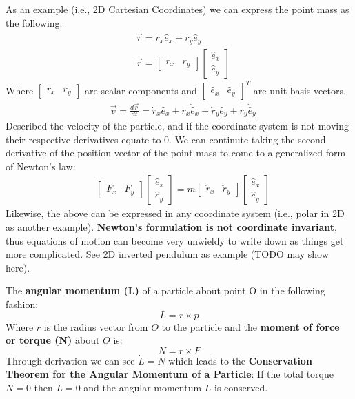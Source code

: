\documentclass{article}
\begin{document}
As an example (i.e., 2D Cartesian Coordinates) we can express the point mass as the following:
\begin{align*}
    & \vec{r} = r_x \hat{e}_x + r_y \hat{e}_y \\
    & \vec{r} = \begin{bmatrix} r_x & r_y \end{bmatrix} \begin{bmatrix}\hat{e}_x \\ \hat{e}_y\end{bmatrix}
\end{align*}
Where $\begin{bmatrix} r_x & r_y \end{bmatrix}$ are scalar components and $\begin{bmatrix}\hat{e}_x & \hat{e}_y\end{bmatrix}^T$ are unit basis vectors.
\begin{align*}
    & \vec{v} = \frac{d\vec{r}}{dt} = \dot{r}_x \hat{e}_x + r_x \dot{\hat{e}}_x + \dot{r}_y \hat{e}_y + r_y \dot{\hat{e}}_y
\end{align*}
Described the velocity of the particle, and if the coordinate system is not moving their respective derivatives equate to 0. We can continute taking the second derivative of the position vector of the point mass to come to a generalized form of Newton's law:
\begin{align*}
    & \begin{bmatrix}F_x & F_y\end{bmatrix}\begin{bmatrix}\hat{e}_x \\ \hat{e}_y\end{bmatrix} = m \begin{bmatrix}\ddot{r}_x & \ddot{r}_y\end{bmatrix}\begin{bmatrix}\hat{e}_x \\ \hat{e}_y\end{bmatrix}
\end{align*}
Likewise, the above can be expressed in any coordinate system (i.e., polar in 2D as another example). \textbf{Newton's formulation is not coordinate invariant}, thus equations of motion can become very unwieldy to write down as things get more complicated. See 2D inverted pendulum as example (TODO may show here).

The \textbf{angular momentum (L)} of a particle about point O in the following fashion:
\begin{equation}
    L = r \times p
\end{equation}
Where $r$ is the radius vector from $O$ to the particle and the \textbf{moment of force or torque (N)} about $O$ is:
\begin{equation}
    N = r \times F
\end{equation}
Through derivation we can see $\dot{L} = N$ which leads to the \textbf{Conservation Theorem for the Angular Momentum of a Particle}: If the total torque $N = 0$ then $\dot{L} = 0$ and the angular momentum $L$ is conserved.
\end{document}
